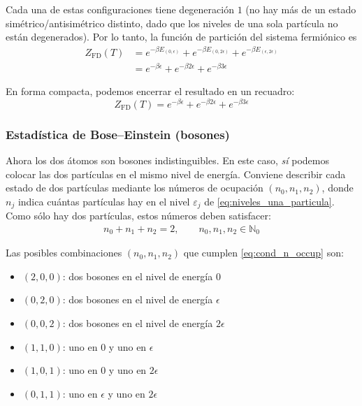 \documentclass{article}
\begin{document}
Cada una de estas configuraciones tiene degeneración \(1\) (no hay más de un estado
simétrico/antisimétrico distinto, dado que los niveles de una sola partícula no
están degenerados). Por lo tanto, la función de partición del sistema fermiónico es
\begin{equation}
\begin{split}
Z_{\text{FD}}(T)
&= e^{-\beta E_{(0,\epsilon)}} + e^{-\beta E_{(0,2\epsilon)}} + e^{-\beta E_{(\epsilon,2\epsilon)}} \\[4pt]
&= e^{-\beta \epsilon}
   + e^{-\beta 2\epsilon}
   + e^{-\beta 3\epsilon}
\end{split}\label{eq:Z_FD_paso}
\end{equation}

En forma compacta, podemos encerrar el resultado en un recuadro:
\begin{equation}
\boxed{
Z_{\text{FD}}(T)
= e^{-\beta \epsilon}
  + e^{-\beta 2\epsilon}
  + e^{-\beta 3\epsilon}
}
\label{eq:Z_FD_final}
\end{equation}

\subsubsection*{\textcolor{orange(colorwheel)}{Estadística de Bose–Einstein (bosones)}}

Ahora los dos átomos son bosones indistinguibles.  
En este caso, \emph{sí} podemos colocar las dos partículas en el mismo nivel de
energía. Conviene describir cada estado de dos partículas mediante los números de
ocupación \((n_{0},n_{1},n_{2})\), donde \(n_{j}\) indica cuántas partículas hay en el
nivel \(\varepsilon_{j}\) de \eqref{eq:niveles_una_particula}. Como sólo hay dos
partículas, estos números deben satisfacer:
\begin{equation}
\begin{split}
n_{0} + n_{1} + n_{2} = 2, \qquad
n_{0},n_{1},n_{2} \in \mathbb{N}_{0}
\end{split}\label{eq:cond_n_occup}
\end{equation}

Las posibles combinaciones \((n_{0},n_{1},n_{2})\) que cumplen \eqref{eq:cond_n_occup}
son:
\begin{itemize}
    \item[$\bullet$] \((2,0,0)\): dos bosones en el nivel de energía \(0\)
    \item[$\bullet$] \((0,2,0)\): dos bosones en el nivel de energía \(\epsilon\)
    \item[$\bullet$] \((0,0,2)\): dos bosones en el nivel de energía \(2\epsilon\)
    \item[$\bullet$] \((1,1,0)\): uno en \(0\) y uno en \(\epsilon\)
    \item[$\bullet$] \((1,0,1)\): uno en \(0\) y uno en \(2\epsilon\)
    \item[$\bullet$] \((0,1,1)\): uno en \(\epsilon\) y uno en \(2\epsilon\)
\end{itemize}
\end{document}
